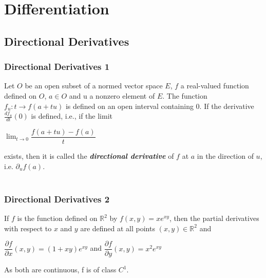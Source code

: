 \documentclass{beamer}
\newcommand{\R}{\mathbb{R}}
\begin{document}

\section{Differentiation}
\subsection{Directional Derivatives}

\begin{frame}
\frametitle{Directional Derivatives 1}
Let $O$ be an open subset of a normed vector space $E$, $f$ a real-valued function
defined on $O$, $a \in O$ and u a nonzero element of $E$. The function $f_{u}:t\rightarrow f(a +tu)$ is defined on an open interval containing 0. If the derivative $\frac{df_{u}}{dt}(0)$ is defined, i.e., if the limit
\begin{center}
$\lim_{t\to 0} \dfrac{f(a+tu)-f(a)}{t}$
\end{center}
exists, then it is called the \textbf{\textit{directional derivative}} of $f$ at $a$ in the direction of $u$, i.e. $\partial_{u}f(a)$.\\~\\
\end{frame}


\begin{frame}
\frametitle{Directional Derivatives 2}
\begin{example}[1] If $f$ is the function defined on $\R^{2}$ by $ f(x,y) =xe^{xy} $, then the partial derivatives with respect to $x$ and $y$ are defined at all points $(x,y) \in \R^{2}$ and
\begin{center}
$\dfrac{\partial f}{\partial x}(x,y) = (1 + xy)e^{xy} $ and  
 $\dfrac{\partial f}{\partial y}(x,y) = x^{2}e^{xy} $
\end{center}
As both are continuous, f is of class $C^{1}$.\\ \normalfont
\end{example}
\end{frame}
\end{document}
